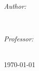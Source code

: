 \documentclass[12pt, letterpaper]{article}
\begin{document}
\vfill %

\begin{minipage}{0.4\textwidth}
	\begin{flushleft} \large
	\emph{Author:}\\
	\paperauthor
	\end{flushleft}
	\end{minipage}
	~
	\begin{minipage}{0.4\textwidth}
	\begin{flushright} \large
	\emph{Professor:} \\
	\papersupervisor
	\end{flushright}
\end{minipage}\\[1cm]

{\large \today}\\ %

\newpage
\end{document}
